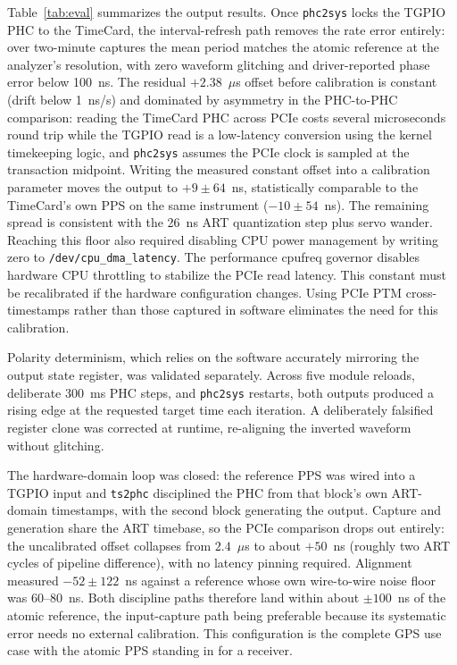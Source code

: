 \documentclass[conference,a4paper]{IEEEtran}
\newcommand{\reftab}[1]{Table~\ref{#1}\xspace}
\newcommand{\phcsys}{\texttt{phc2sys}\xspace}
\newcommand{\tsphc}{\texttt{ts2phc}\xspace}
\begin{document}
\reftab{tab:eval} summarizes the output results. Once \phcsys locks the TGPIO PHC to the TimeCard, the interval-refresh path removes the rate error entirely: over two-minute captures the mean period matches the atomic reference at the analyzer's resolution, with zero waveform glitching and driver-reported phase error below 100~ns. The residual $+2.38$~$\mu$s offset before calibration is constant (drift below 1~ns/s) and dominated by asymmetry in the PHC-to-PHC comparison: reading the TimeCard PHC across PCIe costs several microseconds round trip while the TGPIO read is a low-latency conversion using the kernel timekeeping logic, and \phcsys assumes the PCIe clock is sampled at the transaction midpoint. Writing the measured constant offset into a calibration parameter moves the output to $+9 \pm 64$~ns, statistically comparable to the TimeCard's own PPS on the same instrument ($-10 \pm 54$~ns). The remaining spread is consistent with the 26~ns ART quantization step plus servo wander. Reaching this floor also required disabling CPU power management by writing zero to \texttt{/dev/cpu\_dma\_latency}. The performance cpufreq governor disables hardware CPU throttling to stabilize the PCIe read latency. This constant must be recalibrated if the hardware configuration changes. Using PCIe PTM cross-timestamps rather than those captured in software eliminates the need for this calibration.

Polarity determinism, which relies on the software accurately mirroring the output state register, was validated separately. Across five module reloads, deliberate 300~ms PHC steps, and \phcsys restarts, both outputs produced a rising edge at the requested target time each iteration. A deliberately falsified register clone was corrected at runtime, re-aligning the inverted waveform without glitching.

The hardware-domain loop was closed: the reference PPS was wired into a TGPIO input and \tsphc disciplined the PHC from that block's own ART-domain timestamps, with the second block generating the output. Capture and generation share the ART timebase, so the PCIe comparison drops out entirely: the uncalibrated offset collapses from $2.4$~$\mu$s to about $+50$~ns (roughly two ART cycles of pipeline difference), with no latency pinning required. Alignment measured $-52 \pm 122$~ns against a reference whose own wire-to-wire noise floor was 60--80~ns. Both discipline paths therefore land within about $\pm 100$~ns of the atomic reference, the input-capture path being preferable because its systematic error needs no external calibration. This configuration is the complete GPS use case with the atomic PPS standing in for a receiver.
\end{document}
